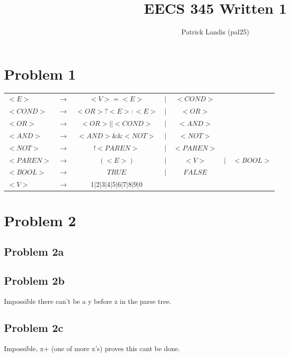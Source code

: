 \documentclass{article}
\title{EECS 345 Written 1}
\author{Patrick Landis (pal25)}
\begin{document}
\maketitle

\section*{Problem 1}
\begin{tabular}{l l c c c c c}
$<E>$ & $\rightarrow$ & $<V> = <E>$ & $|$ & $<COND>$ \\
$<COND>$ & $\rightarrow$ & $<OR> ? <E> : <E>$ & $|$ & $<OR>$ \\
$<OR>$ & $\rightarrow$ & $<OR> || <COND>$ & $|$ & $<AND>$ \\
$<AND>$ & $\rightarrow$ & $<AND> \&\& <NOT>$ & $|$ & $<NOT>$ \\
$<NOT>$ & $\rightarrow$ & $!<PAREN>$ & $|$ & $<PAREN>$ \\
$<PAREN>$ & $\rightarrow$ & $(<E>)$ & $|$ & $<V>$ & $|$ & $<BOOL>$\\
$<BOOL>$ & $\rightarrow$ & $TRUE$ & $|$ & $FALSE$ \\
$<V>$ & $\rightarrow$ & 1$|$2$|$3$|$4$|$5$|$6$|$7$|$8$|$9$|$0 \\
\end{tabular}

\section*{Problem 2}
\subsection*{Problem 2a}

\subsection*{Problem 2b}
Impossible there can't be a y before z in the parse tree. \\

\subsection*{Problem 2c}
Impossible, x+ (one of more x's) proves this cant be done. \\
\end{document}
